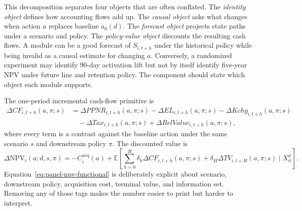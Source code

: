 \documentclass[11pt]{article}
\newcommand{\E}{\mathbb{E}}
\newcommand{\NPV}{\mathrm{NPV}}
\newcommand{\1}{\mathbf{1}}
\begin{document}
This decomposition separates four objects that are often conflated. The
\emph{identity object} defines how accounting flows add up. The
\emph{causal object} asks what changes when action $a$ replaces baseline
$a_0(d)$. The \emph{forecast object} projects state paths under a scenario and
policy. The \emph{policy-value object} discounts the resulting cash flows. A
module can be a good forecast of $S_{i,t+h}$ under the historical policy while
being invalid as a causal estimate for changing $a$. Conversely, a randomized
experiment may identify 90-day activation lift but not by itself identify
five-year NPV under future line and retention policy. The component should
state which object each module supports.

The one-period incremental cash-flow primitive is
\begin{align}
  \Delta CF_{i,t+h}(a,\pi;s)
  &=
  \Delta PPNR_{i,t+h}(a,\pi;s)
  - \Delta EL_{i,t+h}(a,\pi;s)
  - \Delta Kchg_{i,t+h}(a,\pi;s) \nonumber\\
  &\quad
  - \Delta Tax_{i,t+h}(a,\pi;s)
  + \Delta RelValue_{i,t+h}(a,\pi;s),
  \label{eq:panel-cf-primitive}
\end{align}
where every term is a contrast against the baseline action under the same
scenario $s$ and downstream policy $\pi$. The discounted value is
\begin{equation}
  \Delta \NPV_i(a;d,s,\pi)
  =
  -C_i^{\mathrm{acq}}(a)
  +
  \E\!\left[
    \sum_{h=0}^{H}\delta_h\Delta CF_{i,t+h}(a,\pi;s)
    +\delta_H\Delta TV_{i,t+H}(a,\pi;s)
    \mid X_{it}^{d}
  \right].
  \label{eq:panel-npv-functional}
\end{equation}
Equation~\eqref{eq:panel-npv-functional} is deliberately explicit about
scenario, downstream policy, acquisition cost, terminal value, and information
set. Removing any of those tags makes the number easier to print but harder to
interpret.
\end{document}
